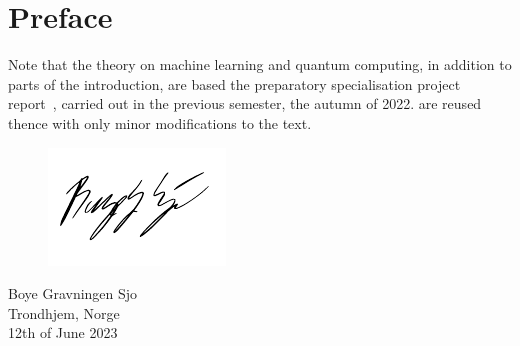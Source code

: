 \chapter{Preface}
\lipsum[1]

Note that the theory on machine learning and quantum computing, in addition to parts of the introduction, are based the preparatory specialisation project report~\autocite{sjo2022}, carried out in the previous semester, the autumn of 2022.
 are reused thence with only minor modifications to the text.

\vspace{1.5cm}
\begin{figure}[h]
  \raggedleft
  \includegraphics[width=0.3\linewidth]{blank.pdf}
\end{figure}
\begin{flushright}
  \vspace{-1.3cm}
  Boye Gravningen Sjo \\
  Trondhjem, Norge \\
  12th of June 2023
\end{flushright}

\cleardoublepage